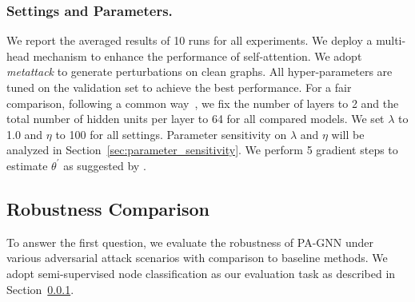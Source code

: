 \documentclass[sigconf]{acmart}
\newcommand{\our}{{PA-GNN}\xspace}
\begin{document}
\subsubsection{Settings and Parameters.} \label{sec:settings_parameters}
We report the averaged results of 10 runs for all experiments. We deploy a multi-head mechanism \cite{vaswani2017attention} to enhance the performance of self-attention. We adopt \textit{metattack} to generate perturbations on clean graphs.
All hyper-parameters are tuned on the validation set to achieve the best performance. For a fair comparison, following a common way~\cite{zhu2019robust}, we fix the number of layers to 2 and the total number of hidden units per layer to 64 for all compared models. 
We set $\lambda$ to 1.0 and $\eta$ to 100 for all settings. Parameter sensitivity on $\lambda$ and $\eta$ will be analyzed in Section~\ref{sec:parameter_sensitivity}. We perform  5 gradient steps to estimate $\theta^\prime$ as suggested by \cite{finn2017model}.






\subsection{Robustness Comparison}


To answer the first question, we evaluate the robustness of \our  under various adversarial attack scenarios with comparison to baseline methods. We adopt semi-supervised node classification as our evaluation task as described in Section~\ref{sec:settings_parameters}.
\end{document}
